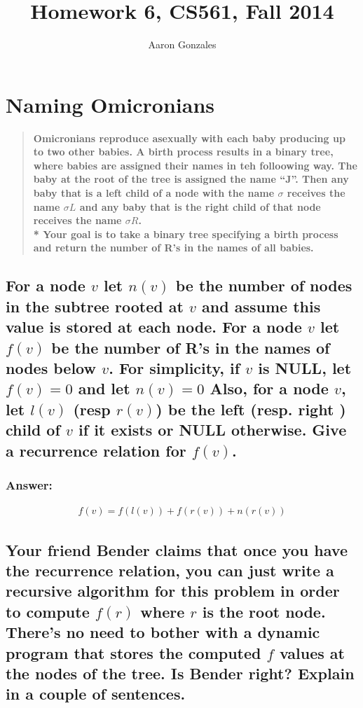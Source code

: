 \documentclass[titlepage]{article}
\theoremstyle{definition}
\begin{document}
\title{Homework 6, CS561, Fall 2014}
\author{Aaron Gonzales}
\maketitle

\section{Naming Omicronians}
  \begin{quote}
    \textbf{Omicronians reproduce asexually with each baby producing up to two
    other babies. A birth process results in a binary tree, where babies are
    assigned their names in teh folloowing way. The baby at the root of the tree
    is assigned the name ``J''. Then any baby that is a left child of a node with
    the name $\sigma$ receives the name $\sigma L$ and any baby that is the right
    child of that node receives the name $\sigma R$. \\*
    Your goal is to take a binary tree specifying a birth process and return the
    number of R's in the names of all babies.}
  \end{quote}

  \subsection{For a node $v$ let $n(v)$ be the number of nodes in the subtree
    rooted at $v$ and assume this value is stored at each node. For a node $v$
    let $f(v)$ be the number of R's in the names of nodes below $v$. For
    simplicity, if $v$ is NULL, let $f(v) = 0$ and let $n(v) = 0$ Also, for a
    node $v$, let $l(v)$ (resp $r(v)$) be the left (resp. right ) child of $v$
    if it exists or NULL otherwise. Give a recurrence relation for $f(v)$.}
    \subsubsection{Answer:}
      \begin{align}
        f(v) = f\left( l (v) \right) + f\left( r (v) \right) + n\left( r(v) \right)
      \end{align}

  \subsection{Your friend Bender claims that once you have the recurrence
    relation, you can just write a recursive algorithm for this problem in
    order to compute $f(r)$ where $r$ is the root node. There's no need to bother
    with a dynamic program that stores the computed $f$ values at the nodes of
    the tree. Is Bender right? Explain in a couple of sentences.}
\end{document}
